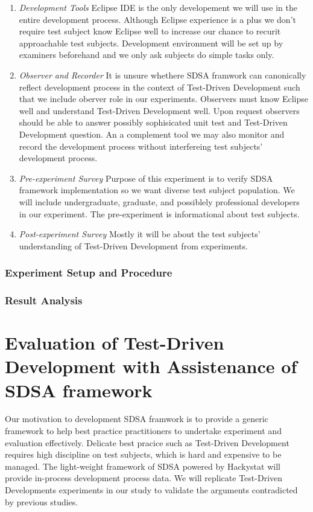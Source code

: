 \begin{enumerate}
\item \emph{Development Tools} Eclipse IDE is the only developement we will
  use in the entire development process. Although Eclipse experience is a
  plus we don't require test subject know Eclipse well to increase our
  chance to recurit approachable test subjects. Development environment
  will be set up by examiners beforehand and we only ask subjects do simple
  tasks only.
\item \emph{Observer and Recorder} It is unsure whethere SDSA framwork can
  canonically reflect development process in the context of Test-Driven
  Development such that we include oberver role in our experiments.
  Observers must know Eclipse well and understand Test-Driven Development
  well. Upon request observers should be able to answer possibly
  sophisicated unit test and Test-Driven Development question. An a
  complement tool we may also monitor and record the development process
  without interfereing test subjects' development process. 
\item \emph{Pre-experiment Survey} Purpose of this experiment is to verify
  SDSA framework implementation so we want diverse test subject population.
  We will include undergraduate, graduate, and possiblely professional
  developers in our experiment. The pre-experiment is informational about
  test subjects.
\item \emph{Post-experiment Survey} Mostly it will be about the test
  subjects' understanding of Test-Driven Development from experiments. 
\end{enumerate}

\subsubsection{Experiment Setup and Procedure}
\subsubsection{Result Analysis}

\section{Evaluation of Test-Driven Development with Assistenance of SDSA framework}
Our motivation to development SDSA framwork is to provide a generic
framework to help best practice practitioners to undertake experiment and
evaluation effectively. Delicate best pracice such as Test-Driven
Development requires high discipline on test subjects, which is hard and
expensive to be managed. The light-weight framework of SDSA powered by
Hackystat will provide in-process development process data. We will replicate
Test-Driven Developments experiments in our study to validate the arguments
contradicted by previous studies.

